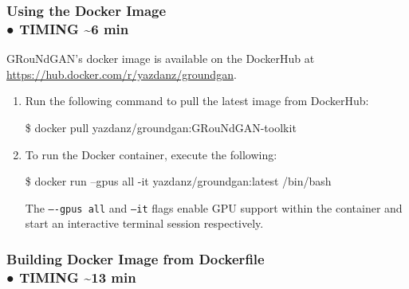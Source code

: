 \subsubsection*{Using the Docker Image  \\ ● TIMING \textasciitilde 6 min}

GRouNdGAN’s docker image is available on the DockerHub at \url{https://hub.docker.com/r/yazdanz/groundgan}.
\begin{enumerate}
    \item Run the following command to pull the latest image from DockerHub: 
\begin{codeblock}
\$ docker pull yazdanz/groundgan:GRouNdGAN-toolkit
\end{codeblock} 
	\item To run the Docker container, execute the following:
\begin{codeblock}
\$ docker run --gpus all -it yazdanz/groundgan:latest /bin/bash
\end{codeblock} 
The \texttt{–-gpus all} and \texttt{–it} flags enable GPU support within the container and start an interactive
terminal session respectively. 
\end{enumerate}

\subsubsection*{Building Docker Image from Dockerfile  \\ ● TIMING \textasciitilde 13 min}

